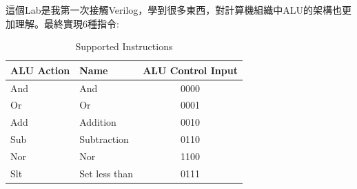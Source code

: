 \documentclass[12pt,a4paper]{article}
\theoremstyle{definition}
\begin{document}
這個Lab是我第一次接觸Verilog，學到很多東西，對計算機組織中ALU的架構也更加理解。最終實現6種指令:
\begin{table}[H]
\centering
\caption
{Supported Instructions}
\label{tab:support}
\begin{tabular}{llc} \toprule
ALU Action & Name & ALU Control Input \\
\midrule
And & And & 0000
\\
Or & Or & 0001
\\
Add & Addition & 0010
\\
Sub & Subtraction & 0110
\\
Nor & Nor & 1100
\\
Slt & Set less than & 0111
\\ \bottomrule
\end{tabular}
\end{table}




\end{document}
